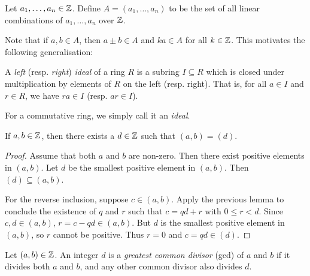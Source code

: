 \begin{definition}
    Let $a_1, \dots, a_n \in \mathbb{Z}$.
    Define $A = (a_1, \dots, a_n)$ to be the set of all linear combinations
    of $a_1, \dots, a_n$ over $\mathbb{Z}$.
\end{definition}
Note that if $a, b \in A$, then $a \pm b \in A$ and $ka \in A$ for all
$k \in \mathbb{Z}$.
This motivates the following generalisation:
\begin{definition*}[Ideal] \label{def:ring:ideal}
    A \emph{left} (resp. \emph{right}) \emph{ideal} of a ring $R$
    is a subring $I \subseteq R$ which is closed under multiplication
    by elements of $R$ on the left (resp. right).
    That is, for all $a \in I$ and $r \in R$, we have $ra \in I$ (resp.
    $ar \in I$).

    For a commutative ring, we simply call it an \emph{ideal}.
\end{definition*}
\begin{lemma*}
    If $a, b \in \mathbb{Z}$, then there exists a $d \in \mathbb{Z}$ such that
    $(a, b) = (d)$.
\end{lemma*}
\begin{proof}
    Assume that both $a$ and $b$ are non-zero.
    Then there exist positive elements in $(a, b)$.
    Let $d$ be the smallest positive element in $(a, b)$.
    Then $(d) \subseteq (a, b)$.

    For the reverse inclusion, suppose $c \in (a, b)$.
    Apply the previous lemma to conclude the existence of $q$ and $r$ such
    that $c = qd + r$ with $0 \le r < d$.
    Since $c, d \in (a, b)$, $r = c - qd \in (a, b)$.
    But $d$ is the smallest positive element in $(a, b)$, so $r$ cannot be
    positive.
    Thus $r = 0$ and $c = qd \in (d)$.
\end{proof}

\begin{definition}[GCD] \label{def:gcd}
    Let $(a, b) \in \mathbb{Z}$.
    An integer $d$ is a \emph{greatest common divisor} (gcd) of $a$ and $b$
    if it divides both $a$ and $b$, and any other common divisor also
    divides $d$.
\end{definition}
